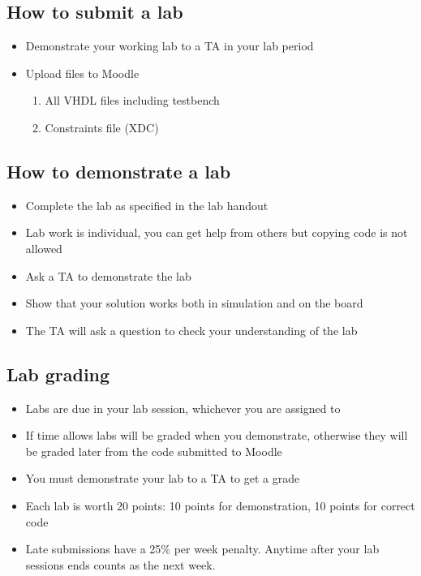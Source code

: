\documentclass[letterpaper]{article}
\begin{document}
\subsection*{How to submit a lab}
\begin{itemize}
    \item Demonstrate your working lab to a TA in your lab period
    \item Upload files to Moodle
    \begin{enumerate}[topsep=0em]
        \item All VHDL files including testbench
        \item Constraints file (XDC)
    \end{enumerate}
\end{itemize}

\subsection*{How to demonstrate a lab}
\begin{itemize}
    \item Complete the lab as specified in the lab handout
    \item Lab work is individual, you can get help from others but copying code is not allowed
    \item Ask a TA to demonstrate the lab
    \item Show that your solution works both in simulation and on the board
    \item The TA will ask a question to check your understanding of the lab
\end{itemize}

\subsection*{Lab grading}
\begin{itemize}
    \item Labs are due in your lab session, whichever you are assigned to
    \item If time allows labs will be graded when you demonstrate, otherwise they will be
          graded later from the code submitted to Moodle
    \item You must demonstrate your lab to a TA to get a grade
    \item Each lab is worth 20 points: 10 points for demonstration, 10 points for correct code
    \item Late submissions have a 25\% per week penalty. Anytime after your lab sessions ends
          counts as the next week.
\end{itemize}
\end{document}
